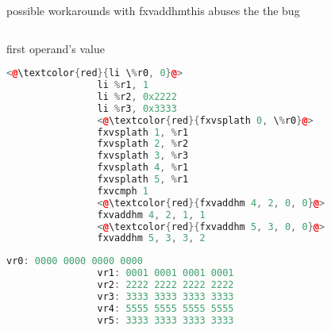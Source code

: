 \documentclass[10pt]{beamer}
\begin{document}
\begin{frame}[fragile]{possible workarounds with fxvaddhm}{this abuses the the bug}
\begin{columns}[t]
    	\begin{column}{0.3\textwidth}
    		\begin{block}{first operand's value}
    		\begin{lstlisting}[language=C++,basicstyle=\ttfamily\scriptsize,keywordstyle=\color{red}]
				<@\textcolor{red}{li \%r0, 0}@>
				li %r1, 1
				li %r2, 0x2222
				li %r3, 0x3333
				<@\textcolor{red}{fxvsplath 0, \%r0}@>
				fxvsplath 1, %r1
				fxvsplath 2, %r2
				fxvsplath 3, %r3
				fxvsplath 4, %r1
				fxvsplath 5, %r1
				fxvcmph 1
				<@\textcolor{red}{fxvaddhm 4, 2, 0, 0}@>
				fxvaddhm 4, 2, 1, 1
				<@\textcolor{red}{fxvaddhm 5, 3, 0, 0}@>
				fxvaddhm 5, 3, 3, 2
	\end{lstlisting}
      			\begin{lstlisting}[language=C++,basicstyle=\fontsize{5}{7}\selectfont\ttfamily,keywordstyle=\color{red}]
				vr0: 0000 0000 0000 0000
				vr1: 0001 0001 0001 0001
				vr2: 2222 2222 2222 2222
				vr3: 3333 3333 3333 3333
				vr4: 5555 5555 5555 5555
				vr5: 3333 3333 3333 3333
				\end{lstlisting}
			\end{block}
    	\end{column}
	\end{columns}
\end{frame}
\end{document}
